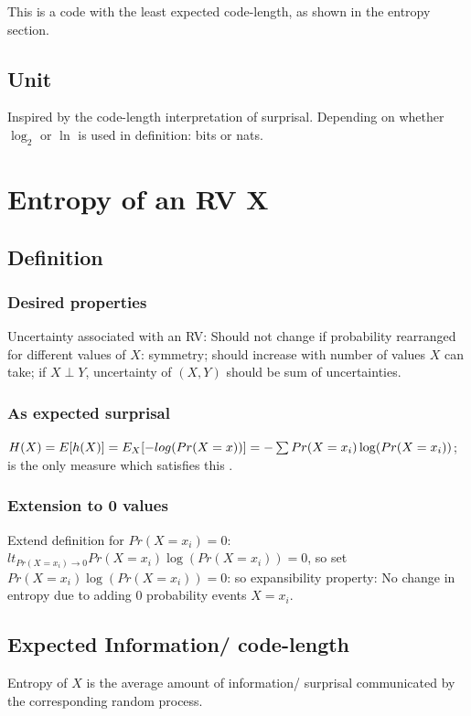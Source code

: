 \documentclass[oneside, article]{memoir}
\begin{document}
This is a code with the least expected code-length, as shown in the entropy section.

\subsection{Unit}
Inspired by the code-length interpretation of surprisal. Depending on whether $\log_{2}$ or $\ln$ is used in definition: bits or nats.

\section{Entropy of an RV X}
\subsection{Definition}
\subsubsection{Desired properties}
Uncertainty associated with an RV: Should not change if probability rearranged for different values of $X$: symmetry; should increase with number of values $X$ can take; if $X \perp Y$, uncertainty of $(X, Y)$ should be sum of uncertainties.

\subsubsection{As expected surprisal}
$H(X) = E[h(X)] = E_{X}[-log(Pr(X=x))] \\
= - \sum Pr(X=x_{i}) \log (Pr(X=x_{i}))$; is the only measure which satisfies this \why.

\subsubsection{Extension to 0 values}
Extend definition for $Pr(X=x_{i}) = 0$: \\
$lt_{Pr(X=x_{i}) \to 0} Pr(X=x_{i}) \log (Pr(X=x_{i})) = 0$, so set $Pr(X=x_{i}) \log (Pr(X=x_{i})) = 0$: so expansibility property: No change in entropy due to adding 0 probability events $X = x_{i}$.

\subsection{Expected Information/ code-length}
Entropy of $X$ is the average amount of information/ surprisal communicated by the corresponding random process.
\end{document}
